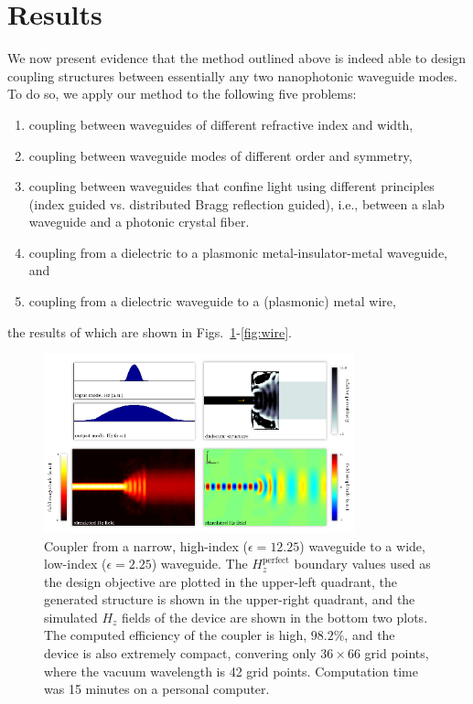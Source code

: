 \documentclass[letterpaper,10pt]{article}
\begin{document}
\section{Results}
We now present evidence that the method outlined above 
    is indeed able to design coupling structures between essentially
    any two nanophotonic waveguide modes.
To do so, we apply our method to the following five problems:
    \begin{enumerate}
    \item coupling between waveguides of different refractive index and width,
    \item coupling between waveguide modes of different order and symmetry,
    \item coupling between waveguides that confine light 
        using different principles 
        (index guided vs. distributed Bragg reflection guided), 
        i.e., between a slab waveguide and a photonic crystal fiber. 
    \item coupling from a dielectric to a plasmonic metal-insulator-metal 
        waveguide, and
    \item coupling from a dielectric waveguide to a (plasmonic) metal wire,
    \end{enumerate}
    the results of which are shown in Figs.~\ref{fig:fiber}-\ref{fig:wire}.
\begin{figure}[htbp]
    \centering
    \includegraphics[width=0.8\textwidth]{1} 
    \caption{Coupler from a narrow, high-index ($\epsilon=12.25$) waveguide to
            a wide, low-index ($\epsilon=2.25$) waveguide. 
        The $H_z^\text{perfect}$ boundary values used as 
            the design objective are plotted in the upper-left quadrant, 
            the generated structure is shown in the upper-right quadrant, and
            the simulated $H_z$ fields of the device are shown 
            in the bottom two plots.
        The computed efficiency of the coupler is high, $98.2\%$, and
            the device is also extremely compact, 
            convering only $36 \times 66$ grid points,
            where the vacuum wavelength is 42 grid points.
        Computation time was 15 minutes on a personal computer.}
    \label{fig:fiber}
\end{figure}
\end{document}

